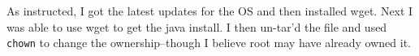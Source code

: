 \documentclass[10pt]{article}
\begin{document}
\par
{}%
\hfill
{}%
\par
As instructed, I got the latest updates for the OS and then installed wget. Next I was able to use wget to get the java install. I then un-tar'd the file and used \verb|chown| to change the ownership--though I believe root may have already owned it. 
\par
{}%
\hfill
{}%
\end{document}
